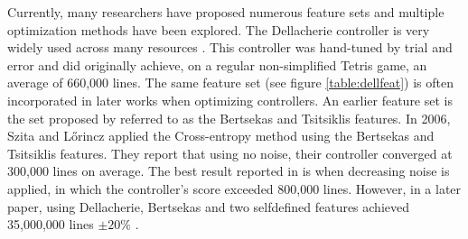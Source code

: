 Currently, many researchers have proposed numerous 
feature sets and multiple 
optimization methods have been explored. 
The Dellacherie controller is very widely used across many resources
\citep{fahey}. This controller was hand-tuned by trial and error 
and did originally achieve, on a regular non-simplified Tetris game, an average of
660,000 lines. The same feature set (see figure \ref{table:dellfeat}) is 
often incorporated in later works when optimizing controllers. An earlier
feature set is the set proposed by \citep{Bertsekas} referred to as the Bertsekas and
Tsitsiklis features. In 2006, Szita and L\H{o}rincz \citep{szita:06} applied the Cross-entropy
method using the Bertsekas and Tsitsiklis features. They report that using no noise,
their controller converged at 300,000 lines on average. 
The best result reported in \citep{szita:06}
is when decreasing noise is applied, 
in which the controller's score exceeded 800,000 lines. 
However, in a later paper, using Dellacherie, 
Bertsekas and two selfdefined features achieved 
35,000,000 lines $\pm 20\%$  \citep{scherrer2009}.\\



